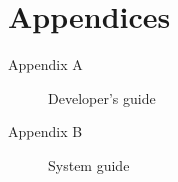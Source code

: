 \section*{Appendices}
\thispagestyle{empty}

\begin{description}
	\item[Appendix A] Developer's guide
	\item[Appendix B] System guide
\end{description}
